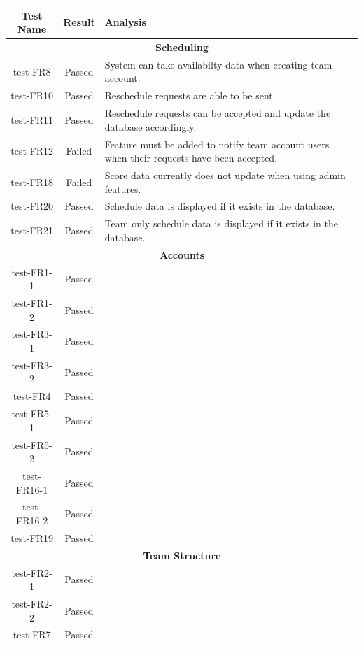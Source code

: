 \documentclass[12pt, titlepage]{article}
\begin{document}
\begin{longtable}{|c|c|p{8cm}|}
  \hline
  \textbf{Test Name} & \textbf{Result} & \textbf{Analysis}\\
  \hline
  \multicolumn{3}{|c|}{\textbf{Scheduling}}\\
  \hline
  test-FR8 & Passed & System can take availabilty data when creating team
  account.\\
  \hline
  test-FR10 & Passed & Reschedule requests are able to be sent.\\
  \hline
  test-FR11 & Passed & Reschedule requests can be accepted and update the
  database accordingly.\\
  \hline
  test-FR12 & Failed & Feature must be added to notify team account users
  when their requests have been accepted.\\
  \hline
  test-FR18 & Failed & Score data currently does not update when using admin
  features.\\
  \hline
  test-FR20 & Passed & Schedule data is displayed if it exists in the
  database.\\
  \hline
  test-FR21 & Passed & Team only schedule data is displayed if it exists in
  the database.\\
  \hline
  \multicolumn{3}{|c|}{\textbf{Accounts}} \\
  \hline
  test-FR1-1 & Passed & \\
  \hline
  test-FR1-2 & Passed & \\
  \hline
  test-FR3-1 & Passed & \\
  \hline
  test-FR3-2 & Passed & \\
  \hline
  test-FR4 & Passed & \\
  \hline
  test-FR5-1 & Passed & \\
  \hline
  test-FR5-2 & Passed & \\
  \hline
  test-FR16-1 & Passed & \\
  \hline
  test-FR16-2 & Passed & \\
  \hline
  test-FR19 & Passed & \\
  \hline
  \multicolumn{3}{|c|}{\textbf{Team Structure}} \\
  \hline
  test-FR2-1 & Passed & \\
  \hline
  test-FR2-2 & Passed & \\
  \hline
  test-FR7 & Passed & \\

\end{longtable}
\end{document}
